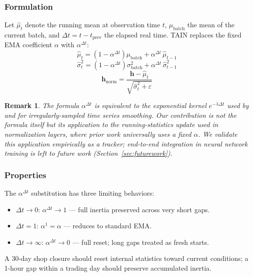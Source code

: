 \documentclass[11pt,a4paper]{article}
\newtheorem{remark}{Remark}
\newcommand{\bh}{\mathbf{h}}
\begin{document}
\subsubsection{Formulation}

Let $\hat{\mu}_t$ denote the running mean at observation time $t$, $\mu_\text{batch}$
the mean of the current batch, and $\Delta t = t - t_{\text{prev}}$ the elapsed real
time. TAIN replaces the fixed EMA coefficient $\alpha$ with $\alpha^{\Delta t}$:
\begin{equation}
  \boxed{
    \hat{\mu}_t = \left(1 - \alpha^{\Delta t}\right)\mu_\text{batch}
    + \alpha^{\Delta t}\,\hat{\mu}_{t-1}
  }
  \label{eq:tain_mean}
\end{equation}
\begin{equation}
  \hat{\sigma}^2_t = \left(1 - \alpha^{\Delta t}\right)\sigma^2_\text{batch}
    + \alpha^{\Delta t}\,\hat{\sigma}^2_{t-1}
\end{equation}
\begin{equation}
  \bh_\text{norm} = \frac{\bh - \hat{\mu}_t}{\sqrt{\hat{\sigma}^2_t + \varepsilon}}
\end{equation}

\begin{remark}
The formula $\alpha^{\Delta t}$ is equivalent to the exponential kernel
$e^{-\lambda \Delta t}$ used by \citet{wright1986} and
\citet{zumbach2001operators} for irregularly-sampled time series smoothing. Our
contribution is not the formula itself but its application to the
running-statistics update used in normalization layers, where prior work
universally uses a fixed $\alpha$. We validate this application empirically as
a tracker; end-to-end integration in neural network training is left to future
work (Section~\ref{sec:futurework}).
\end{remark}

\subsubsection{Properties}

The $\alpha^{\Delta t}$ substitution has three limiting behaviors:
\begin{itemize}[leftmargin=1.5em,itemsep=2pt]
  \item $\Delta t \to 0$: $\alpha^{\Delta t} \to 1$ --- full inertia preserved across
    very short gaps.
  \item $\Delta t = 1$: $\alpha^1 = \alpha$ --- reduces to standard EMA.
  \item $\Delta t \to \infty$: $\alpha^{\Delta t} \to 0$ --- full reset; long gaps
    treated as fresh starts.
\end{itemize}
A 30-day shop closure should reset internal statistics toward current conditions;
a 1-hour gap within a trading day should preserve accumulated inertia.
\end{document}
